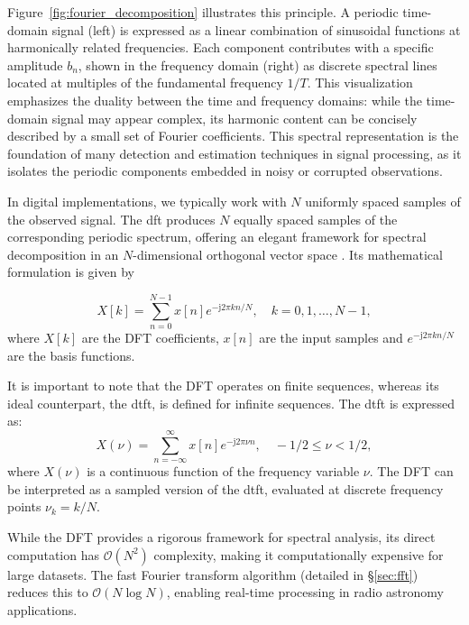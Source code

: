 Figure~\ref{fig:fourier_decomposition} illustrates this principle. A periodic time-domain signal (left) is expressed as a linear combination of sinusoidal functions at harmonically related frequencies. Each component contributes with a specific amplitude $b_n$, shown in the frequency domain (right) as discrete spectral lines located at multiples of the fundamental frequency $1/T$. This visualization emphasizes the duality between the time and frequency domains: while the time-domain signal may appear complex, its harmonic content can be concisely described by a small set of Fourier coefficients. This spectral representation is the foundation of many detection and estimation techniques in signal processing, as it isolates the periodic components embedded in noisy or corrupted observations.

In digital implementations, we typically work with $N$ uniformly spaced samples of the observed signal. The \Gls{dft} produces $N$ equally spaced samples of the corresponding periodic spectrum, offering an elegant framework for spectral decomposition in an $N$-dimensional orthogonal vector space \citep{Cooley1969finite}. Its mathematical formulation is given by

\begin{equation}
X[k] = \sum_{n=0}^{N-1} x[n] e^{-\mathrm{j} 2 \pi k n / N}, \quad k = 0, 1, \ldots, N-1,
\end{equation}
where $X[k]$ are the DFT coefficients, $x[n]$ are the input samples and $e^{-\mathrm{j} 2 \pi k n / N}$ are the basis functions.

It is important to note that the DFT operates on finite sequences, whereas its ideal counterpart, the \gls{dtft}, is defined for infinite sequences. The \gls{dtft} is expressed as:
\begin{equation}
X(\nu) = \sum_{n=-\infty}^{\infty} x[n] e^{-\mathrm{j} 2\pi\nu n}, \quad -1/2 \leq \nu < 1/2,
\end{equation}
where $X(\nu)$ is a continuous function of the frequency variable $\nu$. The DFT can be interpreted as a sampled version of the \gls{dtft}, evaluated at discrete frequency points $\nu_k = k / N$.

While the DFT provides a rigorous framework for spectral analysis, its direct computation has $\mathcal{O}(N^2)$ complexity, making it computationally expensive for large datasets. The fast Fourier transform algorithm (detailed in \S\ref{sec:fft}) reduces this to $\mathcal{O}(N \log N)$, enabling real-time processing in radio astronomy applications. 

